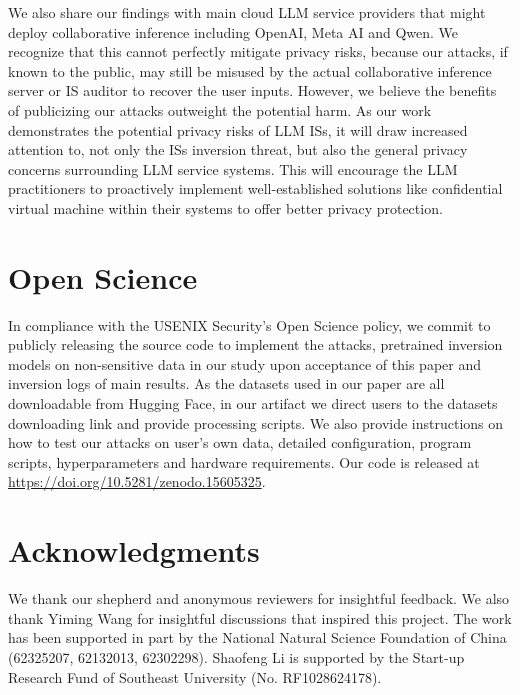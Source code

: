\documentclass[letterpaper,twocolumn,10pt]{article}
\newcommand{\bheading}[1]{{\vspace{4pt}\noindent{\textbf{#1}}}}
\theoremstyle{definition}
\begin{document}
\bheading{Responsible disclose to service providers.}
We also share our findings with main cloud LLM service providers that might deploy collaborative inference including OpenAI, Meta AI and Qwen. We recognize that this cannot perfectly mitigate privacy risks, because our attacks, if known to the public, may still be misused by the actual collaborative inference server or IS auditor to recover the user inputs. However, we believe the benefits of publicizing our attacks outweight the potential harm. As our work demonstrates the potential privacy risks of LLM ISs, it will draw increased attention to, not only the ISs inversion threat, but also the general privacy concerns surrounding LLM service systems. This will encourage the LLM practitioners to proactively implement well-established solutions like confidential virtual machine within their systems to offer better privacy protection.



\section{Open Science}

In compliance with the USENIX Security’s Open Science policy, we commit to publicly releasing the source code to implement the attacks, pretrained inversion models on non-sensitive data in our study upon acceptance of this paper and inversion logs of main results. As the datasets used in our paper are all downloadable from Hugging Face, in our artifact we direct users to the datasets downloading link and provide processing scripts. We also provide instructions on how to test our attacks on user's own data, detailed configuration, program scripts, hyperparameters and hardware requirements.
Our code is released at \url{https://doi.org/10.5281/zenodo.15605325}.


\section*{Acknowledgments}
We thank our shepherd and anonymous reviewers for insightful feedback.
We also thank Yiming Wang for insightful discussions that inspired this project.
The work has been supported in part by the National Natural Science Foundation of China (62325207, 62132013, 62302298).
Shaofeng Li is supported by the Start-up Research Fund of Southeast University (No. RF1028624178).





\end{document}
